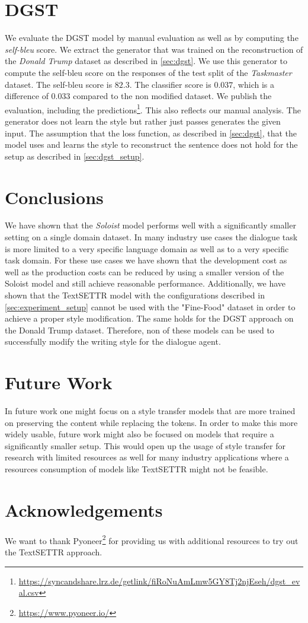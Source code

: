 \documentclass[twocolumn]{tum-article}
\begin{document}
\section{DGST}
We evaluate the DGST model by manual evaluation as well as by computing the \textit{self-bleu} score. We extract the generator that was trained on the reconstruction of the \textit{Donald Trump} dataset as described in \autoref{sec:dgst}. We use this generator to compute the self-bleu score on the responses of the test split of the \textit{Taskmaster} dataset. The self-bleu score is $82.3$. The classifier score is $0.037$, which is a difference of $0.033$ compared to the non modified dataset. We publish the evaluation, including the predictions\footnote{\url{https://syncandshare.lrz.de/getlink/fiRoNuAmLmw5GY8Tj2njEseh/dgst_eval.csv}}. This also reflects our manual analysis. The generator does not learn the style but rather just passes generates the given input. The assumption that the loss function, as described in \autoref{sec:dgst}, that the model uses and learns the style to reconstruct the sentence does not hold for the setup as described in \autoref{sec:dgst_setup}.
\section{Conclusions}
We have shown that the \textit{Soloist} model performs well with a significantly smaller setting on a single domain dataset. In many industry use cases the dialogue task is more limited to a very specific language domain as well as to a very specific task domain. For these use cases we have shown that the development cost as well as the production costs can be reduced by using a smaller version of the Soloist model and still achieve reasonable performance. Additionally, we have shown that the TextSETTR model with the configurations described in \autoref{sec:experiment_setup} cannot be used with the "Fine-Food" dataset in order to achieve a proper style modification. The same holds for the DGST approach on the Donald Trump dataset. Therefore, non of these models can be used to successfully modify the writing style for the dialogue agent.
\section{Future Work}
In future work one might focus on a style transfer models that are more trained on preserving the content while replacing the tokens. In order to make this more widely usable, future work might also be focused on models that require a significantly smaller setup. This would open up the usage of style transfer for research with limited resources as well for many industry applications where a resources consumption of models like TextSETTR might not be feasible.
\section*{Acknowledgements}
We want to thank Pyoneer\footnote{\url{https://www.pyoneer.io/}} for providing us with additional resources to try out the TextSETTR approach. 


\end{document}
